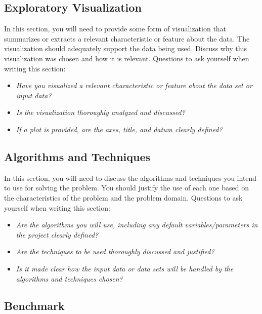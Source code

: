 \documentclass{article}
\begin{document}
\subsection{Exploratory
Visualization}\label{exploratory-visualization}

In this section, you will need to provide some form of visualization
that summarizes or extracts a relevant characteristic or feature about
the data. The visualization should adequately support the data being
used. Discuss why this visualization was chosen and how it is relevant.
Questions to ask yourself when writing this section:

\begin{itemize}
\item
  \emph{Have you visualized a relevant characteristic or feature about
  the data set or input data?}
\item
  \emph{Is the visualization thoroughly analyzed and discussed?}
\item
  \emph{If a plot is provided, are the axes, title, and datum clearly
  defined?}
\end{itemize}

\subsection{Algorithms and
Techniques}\label{algorithms-and-techniques}

In this section, you will need to discuss the algorithms and techniques
you intend to use for solving the problem. You should justify the use of
each one based on the characteristics of the problem and the problem
domain. Questions to ask yourself when writing this section:

\begin{itemize}
\item
  \emph{Are the algorithms you will use, including any default
  variables/parameters in the project clearly defined?}
\item
  \emph{Are the techniques to be used thoroughly discussed and
  justified?}
\item
  \emph{Is it made clear how the input data or data sets will be handled
  by the algorithms and techniques chosen?}
\end{itemize}

\subsection{Benchmark}\label{benchmark}
\end{document}
